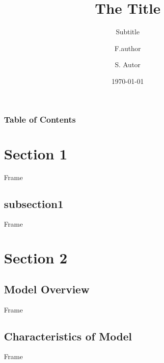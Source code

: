 \documentclass{beamer}
\title{The Title}
\subtitle{Subtitle}
\author[F. Author]{F.author\inst{1}\and S. Autor\inst{2}}
\institute[University of Somewhere and Elsewhere] {
    \inst{1}
        UofS
    \and
    \inst{2}%
        UofE
}
\date{\today}
\begin{document}
\begin{frame}
    \frametitle{Table of Contents}  
    \tableofcontents[  
    sectionstyle=show, 
    hideallsubsections
    ] 
\end{frame}
\section{Section 1}
\begin{frame}
Frame 
\end{frame}
\subsection{subsection1}
\begin{frame}
Frame 
\end{frame}


\section[Section2]{Section 2}
\subsection{Model Overview}
\begin{frame}
Frame 
\end{frame}
\subsection{Characteristics of Model}
\begin{frame}
Frame 
\end{frame}
\end{document}
